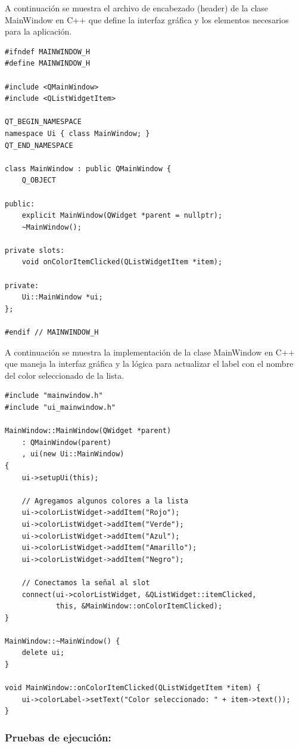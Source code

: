 A continuación se muestra el archivo de encabezado (header) de la clase MainWindow en C++ que define la interfaz gráfica y los elementos necesarios para la aplicación.

\begin{lstlisting}[style=cpp-style, caption={Header de la clase MainWindow en C++}]
#ifndef MAINWINDOW_H
#define MAINWINDOW_H

#include <QMainWindow>
#include <QListWidgetItem>

QT_BEGIN_NAMESPACE
namespace Ui { class MainWindow; }
QT_END_NAMESPACE

class MainWindow : public QMainWindow {
    Q_OBJECT

public:
    explicit MainWindow(QWidget *parent = nullptr);
    ~MainWindow();

private slots:
    void onColorItemClicked(QListWidgetItem *item);

private:
    Ui::MainWindow *ui;
};

#endif // MAINWINDOW_H
\end{lstlisting}

A continuación se muestra la implementación de la clase MainWindow en C++ que maneja la interfaz gráfica y la lógica para actualizar el label con el nombre del color seleccionado de la lista.

\begin{lstlisting}[style=cpp-style, caption={Clase MainWindow en C++}]
#include "mainwindow.h"
#include "ui_mainwindow.h"

MainWindow::MainWindow(QWidget *parent)
    : QMainWindow(parent)
    , ui(new Ui::MainWindow)
{
    ui->setupUi(this);

    // Agregamos algunos colores a la lista
    ui->colorListWidget->addItem("Rojo");
    ui->colorListWidget->addItem("Verde");
    ui->colorListWidget->addItem("Azul");
    ui->colorListWidget->addItem("Amarillo");
    ui->colorListWidget->addItem("Negro");

    // Conectamos la señal al slot
    connect(ui->colorListWidget, &QListWidget::itemClicked,
            this, &MainWindow::onColorItemClicked);
}

MainWindow::~MainWindow() {
    delete ui;
}

void MainWindow::onColorItemClicked(QListWidgetItem *item) {
    ui->colorLabel->setText("Color seleccionado: " + item->text());
}
\end{lstlisting}



\subsubsection{Pruebas de ejecución:}

